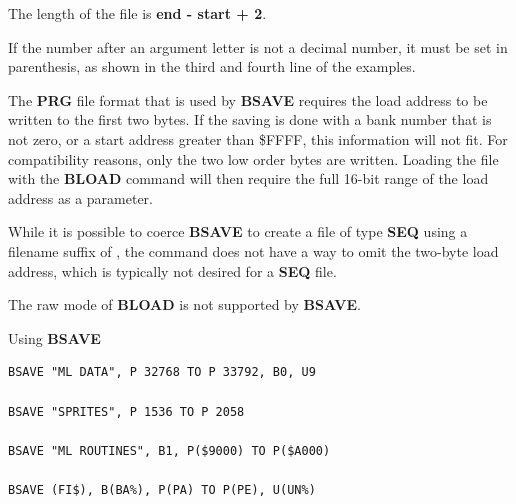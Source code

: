 \begin{description}[leftmargin=2cm,style=nextline]
                  \drivedefinition

                  \unitdefinition

\item [Remarks:]  The length of the file is {\bf end - start + 2}.

                  If the number after an argument letter is not a decimal number, it must be set in parenthesis, as shown in the third and fourth line of the examples.

                  The {\bf PRG} file format that is used by {\bf BSAVE} requires the load address to be written to the first two bytes. If the saving is done with a bank number that is not zero, or a start address greater than \$FFFF, this information will not fit. For compatibility reasons, only the two low order bytes are written. Loading the file with the {\bf BLOAD} command will then require the full 16-bit range of the load address as a parameter.

                  While it is possible to coerce {\bf BSAVE} to create a file of type {\bf SEQ} using a filename suffix of , the command does not have a way to omit the two-byte load address, which is typically not desired for a {\bf SEQ} file.

                  The raw mode of {\bf BLOAD} is not supported by {\bf BSAVE}.

\item [Examples:] Using {\bf BSAVE}

\begin{tcolorbox}[colback=black,coltext=white]
\verbatimfont{\codefont}
\begin{verbatim}
BSAVE "ML DATA", P 32768 TO P 33792, B0, U9

BSAVE "SPRITES", P 1536 TO P 2058

BSAVE "ML ROUTINES", B1, P($9000) TO P($A000)

BSAVE (FI$), B(BA%), P(PA) TO P(PE), U(UN%)
\end{verbatim}
\end{tcolorbox}
\end{description}


\newpage
